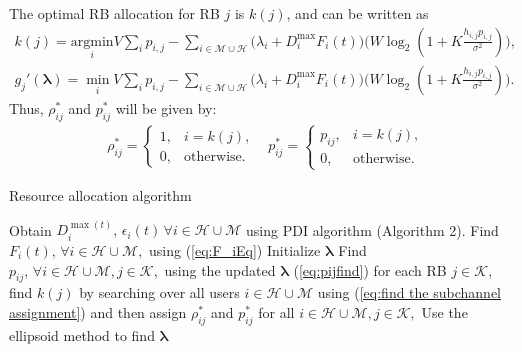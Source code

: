 \documentclass[journal,draftclsnofoot,onecolumn,12pt]{IEEEtran}%
\newcommand{\lambdab}{\boldsymbol{\lambda}}
\begin{document}
The optimal RB allocation for RB $j$ is $k(j)$, and can be written as
\begin{align}
k(j)=\underset{i}{\text{argmin}} V\sum_i p_{i,j}-\sum_{i\in \mathcal{M} \cup \mathcal{H}} \big(\lambda_i+D_i^{\max}F_i(t)\big) \big(W \log_2(1+K \frac{h_{i,j}p_{i,j}}{\sigma^2})\big), \label{eq:find the subchannel assignment}\\
g_j'(\lambdab)=\underset{i}{\min} V\sum_i p_{i,j}-\sum_{i\in \mathcal{M} \cup \mathcal{H}} \big(\lambda_i+D_i^{\max}F_i(t)\big) \big(W \log_2(1+K \frac{h_{i,j}p_{i,j}}{\sigma^2})\big).
\end{align}
Thus, $\rho^*_{ij}$ and $p^*_{ij}$ will be given by: 
\begin{align}
&\rho^*_{ij}=\begin{cases}
1, &i=k(j),\\
0, &\text{otherwise}.
\end{cases}
& p^*_{ij}=\begin{cases}
p_{ij}, &i=k(j),\\
0, &\text{otherwise}.
\end{cases}
\end{align}

\begin{algorithm}[!t]
 \caption{{Resource allocation algorithm}}
 {\begin{algorithmic}[1]\label{alg:RA}
  \STATE Obtain $D_i^{\max(t)},\, \epsilon_i(t)\, \forall i \in \mathcal{H} \cup \mathcal{M}$ using PDI algorithm (Algorithm 2).
  \STATE Find $F_i(t),\, \forall i \in \mathcal{H} \cup \mathcal{M},$ using (\ref{eq:F_iEq})
  \STATE Initialize $\lambdab$
    \STATE Find $p_{ij},\, \forall i \in \mathcal{H} \cup \mathcal{M}, j\in \mathcal{K},$ using the updated $\lambdab$ (\ref{eq:pijfind})
  \STATE for each RB $j\in \mathcal{K}$, find $k(j)$ by searching over all users $i \in \mathcal{H} \cup \mathcal{M}$ using (\ref{eq:find the subchannel assignment}) and then assign $\rho^*_{ij}$ and $p^*_{ij}$ for all $ i \in \mathcal{H} \cup \mathcal{M}, j\in \mathcal{K},$
  \STATE Use the ellipsoid method to find $\lambdab$
  \ENDWHILE
 \end{algorithmic} }
 \end{algorithm}
 
\end{document}
